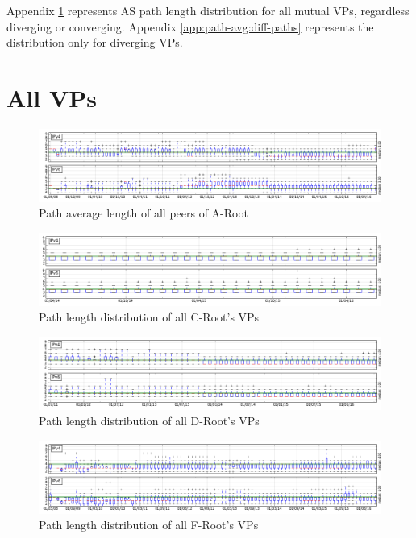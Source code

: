 \begin{appendices}
	Appendix \ref{app:path-avg:all-peers} represents AS path length distribution for all mutual VPs, regardless diverging or converging. Appendix \ref{app:path-avg:diff-paths} represents the distribution only for diverging VPs.
	\section{All VPs}
	\label{app:path-avg:all-peers}
		\begin{figure}[!htb]
			\centering
			\includegraphics[width=6.0in]{img/path_avg_all_a.png}
			\caption{Path average length of all peers of A-Root}
			\label{fig:path-avg-all-a}
		\end{figure}
		\begin{figure}[!htb]
			\centering
			\includegraphics[width=6.0in]{img/path_avg_all_c.png}
			\caption{Path length distribution of all C-Root's VPs}
			\label{fig:path-avg-all-c}
		\end{figure}
		\begin{figure}[!htb]
			\centering
			\includegraphics[width=6.0in]{img/path_avg_all_d.png}
			\caption{Path length distribution of all D-Root's VPs}
			\label{fig:path-avg-all-d}
		\end{figure}
		\begin{figure}[!htb]
			\centering
			\includegraphics[width=6.0in]{img/path_avg_all_f.png}
			\caption{Path length distribution of all F-Root's VPs}
			\label{fig:path-avg-all-f}
		\end{figure}
		

\end{appendices}
